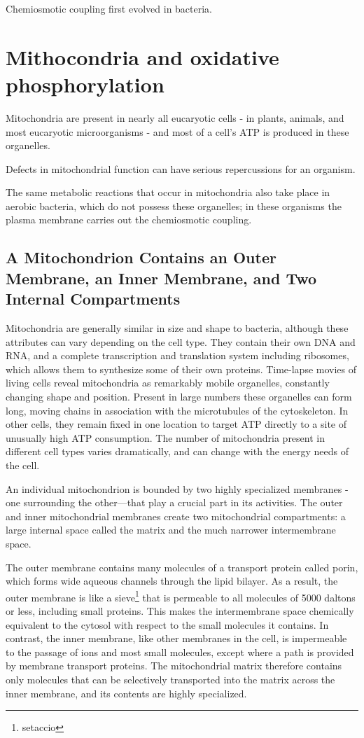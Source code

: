 Chemiosmotic coupling first evolved in bacteria.

\section{Mithocondria and oxidative phosphorylation}

Mitochondria are present in nearly all eucaryotic cells - in plants, animals,
and most eucaryotic microorganisms - and most of a cell’s ATP
is produced in these organelles.

Defects in mitochondrial function can have serious repercussions for an
organism.

The same metabolic reactions that occur in mitochondria also take place
in aerobic bacteria, which do not possess these organelles; in these
organisms the plasma membrane carries out the chemiosmotic coupling.

\subsection{A Mitochondrion Contains an Outer Membrane, an Inner Membrane, and Two Internal Compartments}

Mitochondria are generally similar in size and shape to bacteria, although
these attributes can vary depending on the cell type. They contain their
own DNA and RNA, and a complete transcription and translation system
including ribosomes, which allows them to synthesize some of their
own proteins. Time-lapse movies of living cells reveal mitochondria as
remarkably mobile organelles, constantly changing shape and position.
Present in large numbers these organelles can form long, moving chains in
association with the microtubules of the cytoskeleton. In other cells, they
remain fixed in one location to target ATP directly to a site of unusually
high ATP consumption. The number of mitochondria present in different cell
types varies dramatically, and can change with the energy needs of the cell.

An individual mitochondrion is bounded by two highly specialized
membranes - one surrounding the other—that play a crucial part in its
activities. The outer and inner mitochondrial membranes create two mitochondrial
compartments: a large internal space called the matrix and the much narrower
intermembrane space.

The outer membrane contains many molecules of a transport protein called
porin, which forms wide aqueous channels through the lipid bilayer.
As a result, the outer membrane is like a sieve\footnote{setaccio}
that is permeable to all molecules of 5000 daltons or less, including small
proteins. This makes the intermembrane space chemically equivalent to
the cytosol with respect to the small molecules it contains. In contrast,
the inner membrane, like other membranes in the cell, is impermeable
to the passage of ions and most small molecules, except where a path
is provided by membrane transport proteins. The mitochondrial matrix
therefore contains only molecules that can be selectively transported
into the matrix across the inner membrane, and its contents are highly
specialized.

